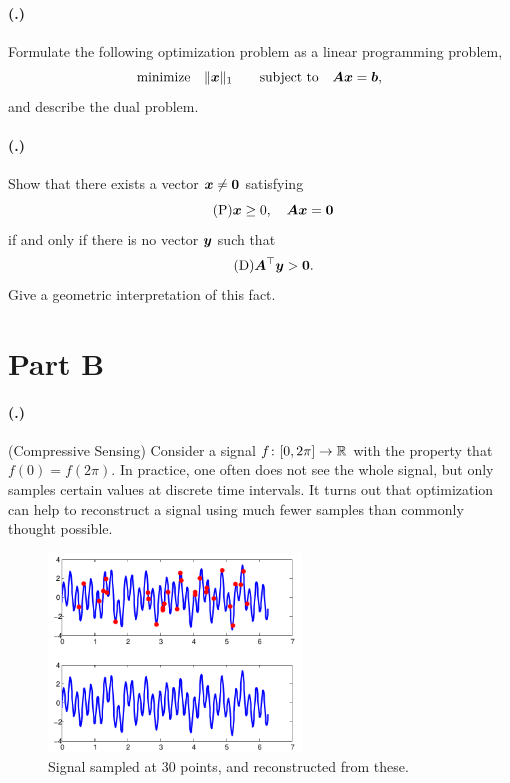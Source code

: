 \documentclass{article}
\newcounter{problemSheetNumber}
\newcounter{problems}
\renewcommand{\problem}{\paragraph{(\theproblemSheetNumber.\theproblems)}\addtocounter{problems}{1}}
\begin{document}
\problem Formulate the following optimization problem as a linear programming problem,
\begin{equation*}
 \text{minimize}\quad \Vert {\bm{x}}\Vert_1 \quad \quad\text{subject to}\quad \bm{A}\bm{x}=\bm{b},
\end{equation*}
and describe the dual problem.

\problem Show that there exists a vector $\bm{x}\neq \bm{0}$ satisfying 
\begin{equation}\label{eq:primal}\tag{P}
 \bm{x}\geq 0, \quad \bm{A}\bm{x}=\bm{0}
\end{equation}
if and only if there is no vector $\bm{y}$ such that
\begin{equation}\label{eq:dual}\tag{D}
 \bm{A}^{\top}\bm{y}>\bm{0}.
\end{equation}
Give a geometric interpretation of this fact.

\newpage

\section*{Part B}
\problem (Compressive Sensing) Consider a signal $f\colon [0,2\pi]\to \mathbb{R}$
with the property that $f(0)=f(2\pi)$. In practice, one often does not see the whole signal, but only samples certain values at discrete time intervals. It turns out that optimization can help to reconstruct a signal using much fewer samples than commonly thought possible.

\begin{figure}[h!]
 \centering
 \includegraphics[width=0.6\textwidth]{images/subsample_cropped.pdf}
 \caption{Signal sampled at 30 points, and reconstructed from these.}
\label{fig:subsample}
\end{figure}
\end{document}
